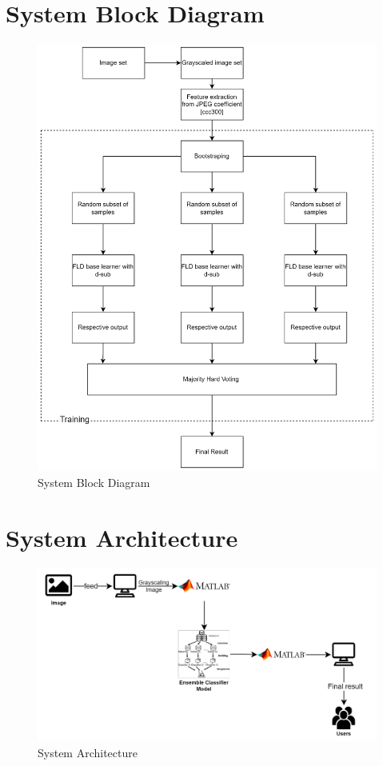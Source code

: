 \section{System Block Diagram}
\begin{figure}[H]
    \centering
    \includegraphics[width=160mm]{./img/blockDiagram.png}
    \caption{System Block Diagram}
\end{figure}
\section{System Architecture}
\begin{figure}[H]
    \includegraphics[width=160mm]{./img/architecture.png}
    \caption{System Architecture}
\end{figure}